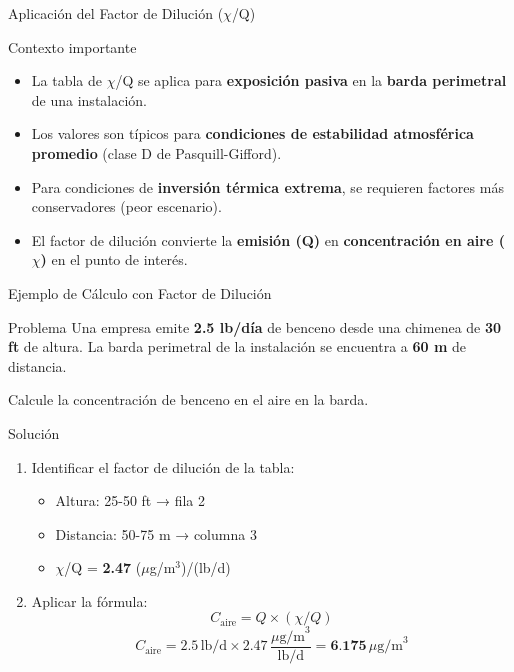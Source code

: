 \documentclass[10pt,compress]{beamer}
\begin{document}
\begin{frame}{Aplicación del Factor de Dilución ($\chi$/Q)}
\begin{block}{Contexto importante}
\begin{itemize}
\item La tabla de $\chi$/Q se aplica para \textbf{exposición pasiva} en la \textbf{barda perimetral} de una instalación.
\item Los valores son típicos para \textbf{condiciones de estabilidad atmosférica promedio} (clase D de Pasquill-Gifford).
\item Para condiciones de \textbf{inversión térmica extrema}, se requieren factores más conservadores (peor escenario).
\item El factor de dilución convierte la \textbf{emisión (Q)} en \textbf{concentración en aire ($\chi$)} en el punto de interés.
\end{itemize}
\end{block}
\end{frame}

\begin{frame}{Ejemplo de Cálculo con Factor de Dilución}
\begin{exampleblock}{Problema}
Una empresa emite \textbf{2.5 lb/día} de benceno desde una chimenea de \textbf{30 ft} de altura. 
La barda perimetral de la instalación se encuentra a \textbf{60 m} de distancia.

Calcule la concentración de benceno en el aire en la barda.
\end{exampleblock}
\vspace{0.3cm}

\pause

\begin{block}{Solución}
\begin{enumerate}
\item Identificar el factor de dilución de la tabla:
\begin{itemize}
\item Altura: 25-50 ft → fila 2
\item Distancia: 50-75 m → columna 3
\item $\chi$/Q = \textbf{2.47} ($\mu$g/m$^3$)/(lb/d)
\end{itemize}
\item Aplicar la fórmula:
\[
C_{\text{aire}} = Q \times (\chi/Q)
\]
\[
C_{\text{aire}} = 2.5 \, \text{lb/d} \times 2.47 \, \frac{\mu\text{g/m}^3}{\text{lb/d}} = \textbf{6.175} \, \mu\text{g/m}^3
\]
\end{enumerate}
\end{block}
\end{frame}
\end{document}
